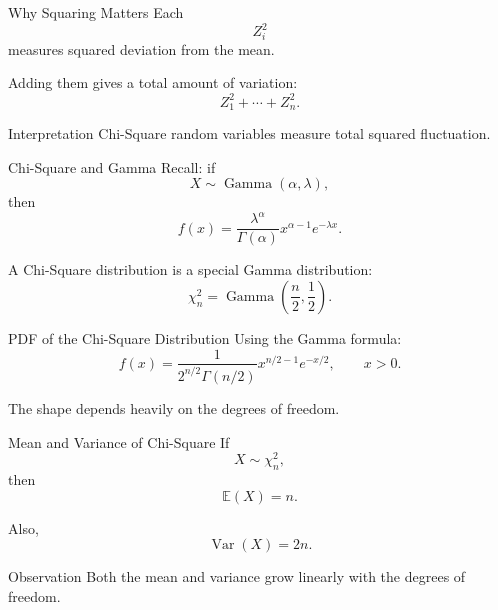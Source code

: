 \begin{frame}{Why Squaring Matters}
Each
\[
Z_i^2
\]
measures squared deviation from the mean.

\vspace{0.25cm}

Adding them gives a total amount of variation:
\[
Z_1^2+\cdots+Z_n^2.
\]

\vspace{0.25cm}

\begin{keybox}{Interpretation}
Chi-Square random variables measure total squared fluctuation.
\end{keybox}
\end{frame}

\begin{frame}{Chi-Square and Gamma}
Recall:
if
\[
X\sim \operatorname{Gamma}(\alpha,\lambda),
\]
then
\[
f(x)
=
\frac{
\lambda^\alpha
}{
\Gamma(\alpha)
}
x^{\alpha-1}e^{-\lambda x}.
\]

\vspace{0.25cm}

A Chi-Square distribution is a special Gamma distribution:
\[
\boxed{
\chi_n^2
=
\operatorname{Gamma}
\left(
\frac n2,
\frac12
\right).
}
\]
\end{frame}

\begin{frame}{PDF of the Chi-Square Distribution}
Using the Gamma formula:
\[
\boxed{
f(x)
=
\frac{
1
}{
2^{n/2}\Gamma(n/2)
}
x^{n/2-1}e^{-x/2},
\qquad x>0.
}
\]

\vspace{0.25cm}

The shape depends heavily on the degrees of freedom.
\end{frame}

\begin{frame}{Mean and Variance of Chi-Square}
If
\[
X\sim \chi_n^2,
\]
then
\[
\boxed{
\mathbb{E}(X)=n.
}
\]

Also,
\[
\boxed{
\operatorname{Var}(X)=2n.
}
\]

\vspace{0.25cm}

\begin{keybox}{Observation}
Both the mean and variance grow linearly with the degrees of freedom.
\end{keybox}
\end{frame}

